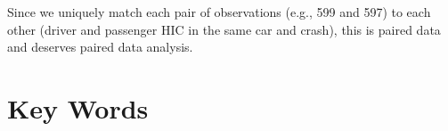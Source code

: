 \documentclass[11pt]{book}\usepackage[]{graphicx}\usepackage[]{color}
\begin{document}
Since we uniquely match each pair of observations (e.g., 599 and 597) to each other (driver and passenger HIC in the same car and crash), this is paired data and deserves paired data analysis.

\section{Key Words}


\twocolumn

\section{}
\end{document}
